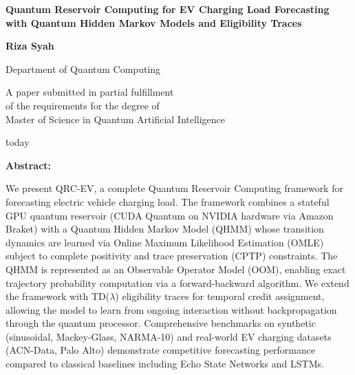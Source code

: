 \documentclass[12pt, a4paper, oneside, notitlepage]{report}
\theoremstyle{plain}
\begin{document}

\begin{titlepage}
  \centering
  \vspace*{2cm}
  {\LARGE\bfseries
    Quantum Reservoir Computing for EV Charging Load Forecasting\\
    with Quantum Hidden Markov Models and Eligibility Traces\par}
  \vspace{1.5cm}
  {\large\bfseries Riza Syah\par}
  \vspace{0.5cm}
  {\large Department of Quantum Computing\par}
  \vspace{2cm}
  {\large A paper submitted in partial fulfillment\\
    of the requirements for the degree of\\
    Master of Science in Quantum Artificial Intelligence\par}
  \vspace{2cm}
  {\large\.today\par}
  \vspace{1.5cm}
  \textbf{Abstract:}
  \parbox{0.85\textwidth}{\small
    We present QRC-EV, a complete Quantum Reservoir Computing framework for
    forecasting electric vehicle charging load. The framework combines a
    stateful GPU quantum reservoir (CUDA Quantum on NVIDIA hardware via
    Amazon Braket) with a Quantum Hidden Markov Model (QHMM) whose
    transition dynamics are learned via Online Maximum Likelihood
    Estimation (OMLE) subject to complete positivity and trace
    preservation (CPTP) constraints. The QHMM is represented as an
    Observable Operator Model (OOM), enabling exact trajectory probability
    computation via a forward-backward algorithm. We extend the framework
    with TD($\lambda$) eligibility traces for temporal credit assignment,
    allowing the model to learn from ongoing interaction without
    backpropagation through the quantum processor. Comprehensive
    benchmarks on synthetic (sinusoidal, Mackey-Glass, NARMA-10) and
    real-world EV charging datasets (ACN-Data, Palo Alto) demonstrate
    competitive forecasting performance compared to classical baselines
    including Echo State Networks and LSTMs.}
  \clearpage
\end{titlepage}

\end{document}
